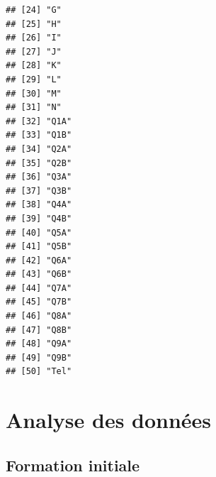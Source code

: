 \documentclass[12pt,english,french]{article}\usepackage{graphicx, color}
\makeatletter
\newenvironment{kframe}{%
 \def\at@end@of@kframe{}%
 \ifinner\ifhmode%
  \def\at@end@of@kframe{\end{minipage}}%
  \begin{minipage}{\columnwidth}%
 \fi\fi%
 \def\FrameCommand##1{\hskip\@totalleftmargin \hskip-\fboxsep
 \colorbox{shadecolor}{##1}\hskip-\fboxsep
     \hskip-\linewidth \hskip-\@totalleftmargin \hskip\columnwidth}%
 \MakeFramed {\advance\hsize-\width
   \@totalleftmargin\z@ \linewidth\hsize
   \@setminipage}}%
 {\par\unskip\endMakeFramed%
 \at@end@of@kframe}
\newenvironment{knitrout}{}{} %
\makeatother
\begin{document}
\begin{knitrout}
\begin{kframe}
\begin{verbatim}
## [24] "G"                                                                  
## [25] "H"                                                                  
## [26] "I"                                                                  
## [27] "J"                                                                  
## [28] "K"                                                                  
## [29] "L"                                                                  
## [30] "M"                                                                  
## [31] "N"                                                                  
## [32] "Q1A"                                                                
## [33] "Q1B"                                                                
## [34] "Q2A"                                                                
## [35] "Q2B"                                                                
## [36] "Q3A"                                                                
## [37] "Q3B"                                                                
## [38] "Q4A"                                                                
## [39] "Q4B"                                                                
## [40] "Q5A"                                                                
## [41] "Q5B"                                                                
## [42] "Q6A"                                                                
## [43] "Q6B"                                                                
## [44] "Q7A"                                                                
## [45] "Q7B"                                                                
## [46] "Q8A"                                                                
## [47] "Q8B"                                                                
## [48] "Q9A"                                                                
## [49] "Q9B"                                                                
## [50] "Tel"
\end{verbatim}
\end{kframe}
\end{knitrout}


\section{Analyse des données}

\subsection{Formation initiale}
\end{document}
